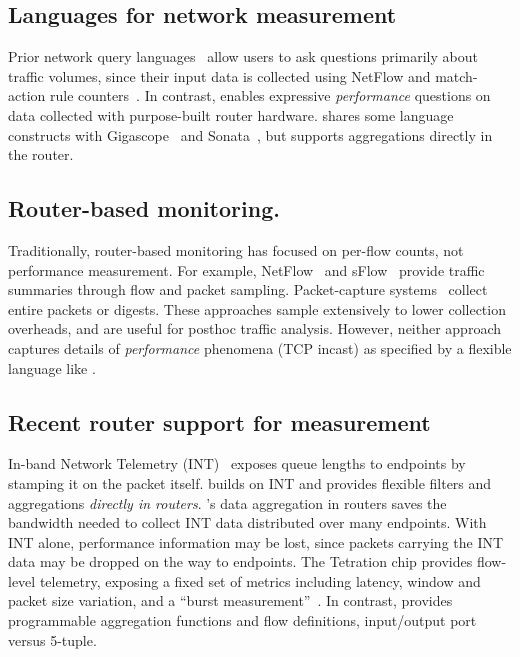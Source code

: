 \subsection{Languages for network measurement} Prior network query
languages~\cite{gigascope, frenetic, path_query, streaming-monitoring} allow
users to ask questions primarily about traffic volumes, since their input data
is collected using NetFlow and match-action rule counters~\cite{openflow}. In
contrast, \TheSystem enables expressive {\em performance} questions on data
collected with purpose-built router hardware. \TheSystem shares some language
constructs with Gigascope~\cite{gigascope} and
Sonata~\cite{streaming-monitoring}, but supports aggregations directly in the
router.

\subsection{Router-based monitoring.} Traditionally, router-based monitoring has
focused on per-flow counts, not performance measurement. For example,
NetFlow~\cite{netflow} and sFlow~\cite{sflow} provide traffic summaries
through flow and packet sampling. Packet-capture systems~\cite{cisco-span,
niksun, netsight, everflow, pathdump, path_query} collect entire packets or
digests. These approaches sample extensively to lower collection
overheads, and are useful for posthoc traffic analysis. However, neither
approach captures details of {\em performance} phenomena (\eg TCP incast) as
specified by a flexible language like \TheSystem.

\subsection{Recent router support for measurement} In-band Network Telemetry
(INT)~\cite{int, tpp} exposes queue lengths to endpoints by stamping it on the
packet itself. \TheSystem builds on INT and provides flexible filters and
aggregations {\em directly in routers}.  \TheSystem's data aggregation in
routers saves the bandwidth needed to collect INT data distributed over many
endpoints. With INT alone, performance information may be lost, since packets
carrying the INT data may be dropped on the way to endpoints. The Tetration
chip provides flow-level telemetry, exposing a fixed set of metrics including
latency, window and packet size variation, and a ``burst
measurement''~\cite{tetration-telemetry}. In contrast, \TheSystem provides
programmable aggregation functions and flow definitions, \eg input/output port
versus 5-tuple.

